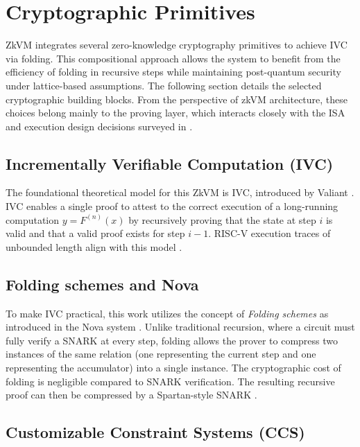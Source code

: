 \section{Cryptographic Primitives}\label{sec:crypto}

ZkVM integrates several zero-knowledge cryptography primitives to achieve
IVC via folding. This compositional approach allows the system to benefit from
the efficiency of folding in recursive steps while maintaining post-quantum
security under lattice-based assumptions. The following section details the
selected cryptographic building blocks. From the perspective of zkVM
architecture, these choices belong mainly to the proving layer, which interacts
closely with the ISA and execution design decisions surveyed in
\cite{SoKZkVMs}.

\subsection{Incrementally Verifiable Computation (IVC)}

The foundational theoretical model for this ZkVM is IVC, introduced by Valiant
\cite{ValiantIVC}. IVC enables a single proof to attest to the correct
execution of a long-running computation $y = F^{(n)}(x)$ by recursively
proving that the state at step $i$ is valid and that a valid proof exists for
step $i-1$. RISC-V execution traces of unbounded length align with this model
\cite{SuperNova}.

\subsection{Folding schemes and Nova}

To make IVC practical, this work utilizes the concept of \textit{Folding
	schemes} as introduced in the Nova system \cite{Nova}. Unlike traditional
recursion, where a circuit must fully verify a SNARK at every step, folding
allows the prover to compress two instances of the same relation (one
representing the current step and one representing the accumulator) into a
single instance. The cryptographic cost of folding is negligible compared to
SNARK verification. The resulting recursive proof can then be compressed by a
Spartan-style SNARK \cite{Spartan}.

\subsection{Customizable Constraint Systems (CCS)}

